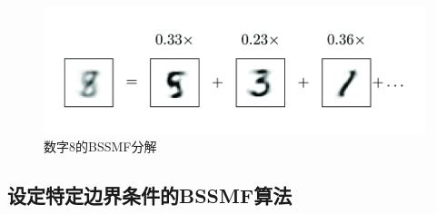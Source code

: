 \documentclass[12pt]{article}
\begin{document}
\begin{figure}[H]
    \centering
    \includegraphics[width=\textwidth]{images/deconposition.png}
    \caption{数字8的BSSMF分解}
    \label{fig:BSSMF2}
\end{figure}

\subsection{设定特定边界条件的BSSMF算法}
\end{document}
